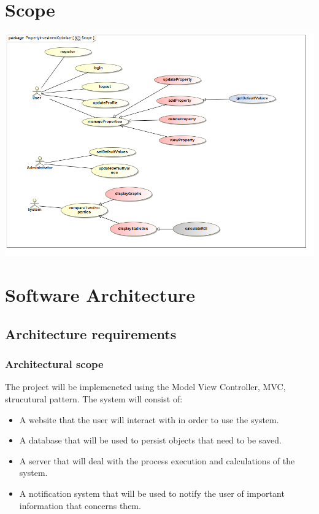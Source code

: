 \documentclass[a4paper,12pt]{article}
\begin{document}
\section{Scope}
\includegraphics[width=1\textwidth]{./Images/Scope.png}

\newpage
\section{Software Architecture}
\subsection{Architecture requirements}
\subsubsection{Architectural scope}
The project will be implemeneted using the Model View Controller, MVC, strucutural pattern.
The system will consist of:\begin{itemize}
	\item A website that the user will interact with in order to use the system.
	\item A database that will be used to persist objects that need to be saved.
	\item A server that will deal with the process execution and calculations of the system.
	\item A notification system that will be used to notify the user of important information that concerns them.
\end{itemize}
\end{document}
